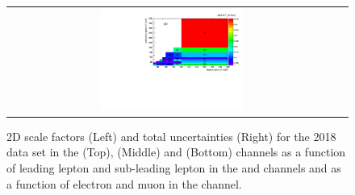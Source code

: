 \begin{figure}[htb]
\begin{center}
\begin{tabular}{cc}
      \includegraphics[width=0.45\textwidth]{fig_2018_TrigSF/h2D_lepABpt_mumu_BinErrors.pdf}\\
    \end{tabular}
    \caption{2D scale factors (Left) and total uncertainties (Right) for the 2018 data set in the \emu (Top), \ee (Middle) and \mumu (Bottom) channels as a function of leading lepton \pT and sub-leading lepton \pT in the \ee and \mumu channels and as a function of electron \pT and muon \pT in the \emu channel.}
    \label{TrigSF_2018_4}
  \end{center}
\end{figure}

